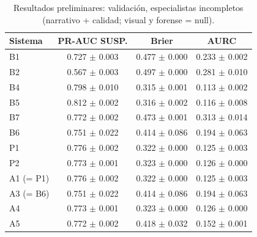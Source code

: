 \begin{table}[H]\centering\footnotesize
\begin{tabular}{lccc}
\toprule
Sistema & PR-AUC SUSP. & Brier & AURC \\
\midrule
B1 & 0.727 $\pm$ 0.003 & 0.477 $\pm$ 0.000 & 0.233 $\pm$ 0.002 \\
B2 & 0.567 $\pm$ 0.003 & 0.497 $\pm$ 0.000 & 0.281 $\pm$ 0.010 \\
B4 & 0.798 $\pm$ 0.010 & 0.315 $\pm$ 0.001 & 0.113 $\pm$ 0.002 \\
B5 & 0.812 $\pm$ 0.002 & 0.316 $\pm$ 0.002 & 0.116 $\pm$ 0.008 \\
B7 & 0.772 $\pm$ 0.002 & 0.473 $\pm$ 0.001 & 0.313 $\pm$ 0.014 \\
B6 & 0.751 $\pm$ 0.022 & 0.414 $\pm$ 0.086 & 0.194 $\pm$ 0.063 \\
P1 & 0.776 $\pm$ 0.002 & 0.322 $\pm$ 0.000 & 0.125 $\pm$ 0.003 \\
P2 & 0.773 $\pm$ 0.001 & 0.323 $\pm$ 0.000 & 0.126 $\pm$ 0.000 \\
A1 (= P1) & 0.776 $\pm$ 0.002 & 0.322 $\pm$ 0.000 & 0.125 $\pm$ 0.003 \\
A3 (= B6) & 0.751 $\pm$ 0.022 & 0.414 $\pm$ 0.086 & 0.194 $\pm$ 0.063 \\
A4 & 0.773 $\pm$ 0.001 & 0.323 $\pm$ 0.000 & 0.126 $\pm$ 0.000 \\
A5 & 0.772 $\pm$ 0.002 & 0.418 $\pm$ 0.032 & 0.152 $\pm$ 0.001 \\
\bottomrule
\end{tabular}
\caption{Resultados preliminares: validación, especialistas incompletos (narrativo + calidad; visual y forense = null).}
\label{tab:val_prelim}
\end{table}
